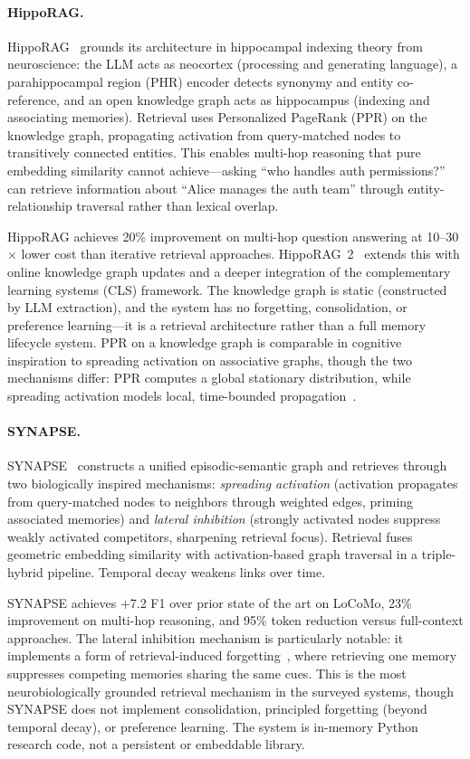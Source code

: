 \paragraph{HippoRAG.}
HippoRAG~\cite{gutierrez2024hipporag} grounds its architecture in
hippocampal indexing theory from neuroscience: the LLM acts as
neocortex (processing and generating language), a parahippocampal
region (PHR) encoder detects synonymy and entity co-reference, and an
open knowledge graph acts as hippocampus (indexing and associating
memories). Retrieval uses Personalized PageRank (PPR) on the knowledge
graph, propagating activation from query-matched nodes to
transitively connected entities. This enables multi-hop reasoning that
pure embedding similarity cannot achieve---asking ``who handles auth
permissions?'' can retrieve information about ``Alice manages the auth
team'' through entity-relationship traversal rather than lexical
overlap.

HippoRAG achieves 20\% improvement on multi-hop question answering at
10--30$\times$ lower cost than iterative retrieval
approaches. HippoRAG~2~\cite{gutierrez2025rag2memory} extends this
with online knowledge graph updates and a deeper integration of the
complementary learning systems (CLS) framework. The knowledge graph
is static (constructed by LLM extraction), and the system has no
forgetting, consolidation, or preference learning---it is a retrieval
architecture rather than a full memory lifecycle system. PPR on a
knowledge graph is comparable in cognitive inspiration to spreading
activation on associative graphs, though the two mechanisms differ:
PPR computes a global stationary distribution, while spreading
activation models local, time-bounded propagation~\cite{collins1975}.

\paragraph{SYNAPSE.}
SYNAPSE~\cite{jiang2026synapse} constructs a unified episodic-semantic
graph and retrieves through two biologically inspired mechanisms:
\emph{spreading activation} (activation propagates from query-matched
nodes to neighbors through weighted edges, priming associated
memories) and \emph{lateral inhibition} (strongly activated nodes
suppress weakly activated competitors, sharpening retrieval focus).
Retrieval fuses geometric embedding similarity with activation-based
graph traversal in a triple-hybrid pipeline. Temporal decay weakens
links over time.

SYNAPSE achieves +7.2 F1 over prior state of the art on LoCoMo, 23\%
improvement on multi-hop reasoning, and 95\% token reduction versus
full-context approaches. The lateral inhibition mechanism is
particularly notable: it implements a form of retrieval-induced
forgetting~\cite{anderson1994}, where retrieving one memory
suppresses competing memories sharing the same cues. This is the most
neurobiologically grounded retrieval mechanism in the surveyed
systems, though SYNAPSE does not implement consolidation, principled
forgetting (beyond temporal decay), or preference learning. The
system is in-memory Python research code, not a persistent or
embeddable library.

